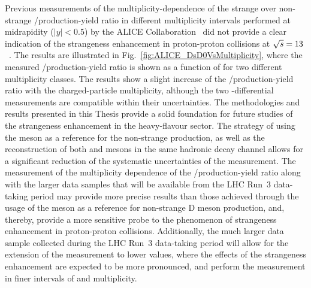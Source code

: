 Previous measurements of the multiplicity-dependence of the strange over non-strange \ds/\dz production-yield ratio in different multiplicity intervals performed at midrapidity ($\lvert y\rvert<0.5$) by the ALICE Collaboration~\cite{ALICE:2021npz} did not provide a clear indication of the strangeness enhancement in proton-proton collisions at $\sqrt{s}=13$~\tev. The results are illustrated in Fig.~\ref{fig:ALICE_DsD0VsMultiplicity}, where the measured \ds/\dz production-yield ratio is shown as a function of \pt for two different multiplicity classes. The results show a slight increase of the \ds/\dz production-yield ratio with the charged-particle multiplicity, although the two \pt-differential measurements are compatible within their uncertainties. The methodologies and results presented in this Thesis provide a solid foundation for future studies of the strangeness enhancement in the heavy-flavour sector. The strategy of using the \dpl meson as a reference for the non-strange production, as well as the reconstruction of both \ds and \dpl mesons in the same hadronic decay channel allows for a significant reduction of the systematic uncertainties of the measurement. The measurement of the multiplicity dependence of the \ds/\dpl production-yield ratio along with the larger data samples that will be available from the LHC Run~3 data-taking period may provide more precise results than those achieved through the usage of the \dz meson as a reference for non-strange D meson production, and, thereby, provide a more sensitive probe to the phenomenon of strangeness enhancement in proton-proton collisions. Additionally, the much larger data sample collected during the LHC Run~3 data-taking period will allow for the extension of the measurement to lower \pt values, where the effects of the strangeness enhancement are expected to be more pronounced, and perform the measurement in finer intervals of \pt and multiplicity.


